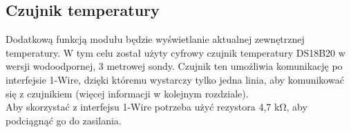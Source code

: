 
\subsection{Czujnik temperatury}
Dodatkową funkcją modułu będzie wyświetlanie aktualnej zewnętrznej temperatury. W tym celu został użyty cyfrowy czujnik temperatury DS18B20 w wersji wodoodpornej, 3 metrowej sondy. Czujnik ten umożliwia komunikację po interfejsie 1-Wire, dzięki któremu wystarczy tylko jedna linia, aby komunikować się z czujnikiem (więcej informacji w kolejnym rozdziale).\\
Aby skorzystać z interfejsu 1-Wire potrzeba użyć rezystora 4,7 kΩ, aby podciągnąć go do zasilania.

